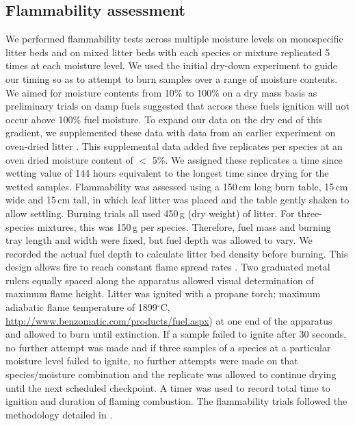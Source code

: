 \documentclass[letterpaper,12pt]{article}
\begin{document}
\subsection*{Flammability assessment}

We performed flammability tests across multiple moisture levels on monospecific
litter beds and on mixed litter beds with each species or mixture replicated 5
times at each moisture level. We used the initial dry-down experiment to guide
our timing so as to attempt to burn samples over a range of moisture contents.
We aimed for moisture contents from 10\% to 100\% on a dry mass basis as
preliminary trials on damp fuels suggested that across these fuels ignition
will not occur above 100\% fuel moisture. To expand our data on the dry end of
this gradient, we supplemented these data with data from an earlier experiment
on oven-dried litter \citep{Magalhaes+Schwilk-2012}. This supplemental data
added five replicates per species at an oven dried moisture content of $<$ 5\%.
We assigned these replicates a time since wetting value of 144 hours equivalent
to the longest time since drying for the wetted samples. Flammability was
assessed using a 150\,cm long burn table, 15\,cm wide and 15\,cm tall, in which
leaf litter was placed and the table gently shaken to allow settling. Burning
trials all used 450\,g (dry weight) of litter. For three-species mixtures, this
was 150\,g per species. Therefore, fuel mass and burning tray length and width
were fixed, but fuel depth was allowed to vary. We recorded the actual fuel
depth to calculate litter bed density before burning. This design allows fire
to reach constant flame spread rates \citep{Magalhaes+Schwilk-2012}. Two
graduated metal rulers equally spaced along the apparatus allowed visual
determination of maximum flame height. Litter was ignited with a propane torch;
maximum adiabatic flame temperature of 1899$^\circ$C,
\url{http://www.benzomatic.com/products/fuel.aspx}) at one end of the apparatus
and allowed to burn until extinction. If a sample failed to ignite after 30
seconds, no further attempt was made and if three samples of a species at a
particular moisture level failed to ignite, no further attempts were made on
that species/moisture combination and the replicate was allowed to continue
drying until the next scheduled checkpoint. A timer was used to record total
time to ignition and duration of flaming combustion. The flammability trials
followed the methodology detailed in \citet{Magalhaes+Schwilk-2012}.
 
\end{document}
